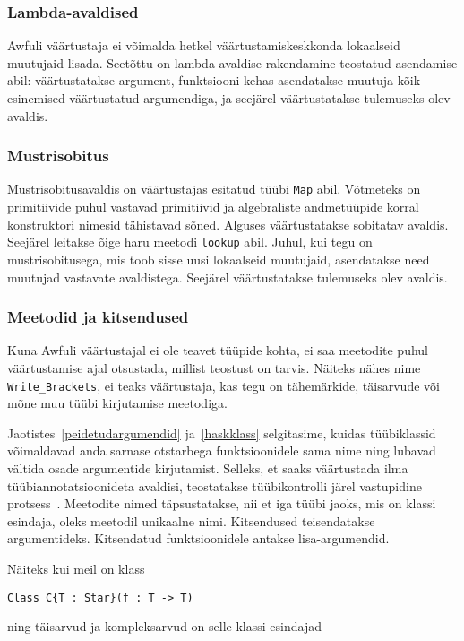 \documentclass[12pt]{article}
\begin{document}
      \subsubsection{Lambda-avaldised}
        Awfuli väärtustaja ei võimalda hetkel väärtustamiskeskkonda lokaalseid muutujaid lisada. Seetõttu on lambda-avaldise rakendamine teostatud asendamise abil: väärtustatakse argument, funktsiooni kehas asendatakse muutuja kõik esinemised väärtustatud argumendiga, ja seejärel väärtustatakse tulemuseks olev avaldis.
      \subsubsection{Mustrisobitus}
        Mustrisobitusavaldis on väärtustajas esitatud tüübi \verb!Map! abil. Võtmeteks on primitiivide puhul vastavad primitiivid ja algebraliste andmetüüpide korral konstruktori nimesid tähistavad sõned. Alguses väärtustatakse sobitatav avaldis. Seejärel leitakse õige haru meetodi \verb!lookup! abil. Juhul, kui tegu on mustrisobitusega, mis toob sisse uusi lokaalseid muutujaid, asendatakse need muutujad vastavate avaldistega. Seejärel väärtustatakse tulemuseks olev avaldis.
      \subsubsection{Meetodid ja kitsendused}
        Kuna Awfuli väärtustajal ei ole teavet tüüpide kohta, ei saa meetodite puhul väärtustamise ajal otsustada, millist teostust on tarvis. Näiteks nähes nime \verb!Write_Brackets!, ei teaks väärtustaja, kas tegu on tähemärkide, täisarvude või mõne muu tüübi kirjutamise meetodiga.

        Jaotistes~\ref{peidetudargumendid} ja~\ref{haskklass} selgitasime, kuidas tüübiklassid võimaldavad anda sarnase otstarbega funktsioonidele sama nime ning lubavad vältida osade argumentide kirjutamist. Selleks, et saaks väärtustada ilma tüübiannotatsioonideta avaldisi, teostatakse tüübikontrolli järel vastupidine protsess~\cite{How}. Meetodite nimed täpsustatakse, nii et iga tüübi jaoks, mis on klassi esindaja, oleks meetodil unikaalne nimi. Kitsendused teisendatakse argumentideks. Kitsendatud funktsioonidele antakse lisa-argumendid.

        Näiteks kui meil on klass

        \begin{verbatim}Class C{T : Star}(f : T -> T)\end{verbatim}

        ning täisarvud ja kompleksarvud on selle klassi esindajad
\end{document}
